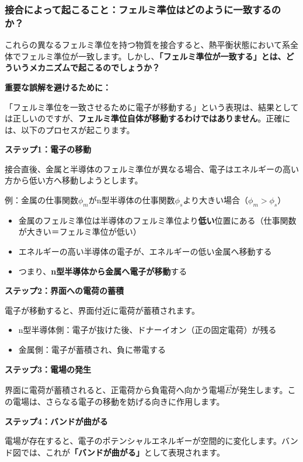 \subsubsection{接合によって起こること：フェルミ準位はどのように一致するのか？}

これらの異なるフェルミ準位を持つ物質を接合すると、熱平衡状態において系全体でフェルミ準位が一致します。しかし、\textbf{「フェルミ準位が一致する」とは、どういうメカニズムで起こるのでしょうか？}

\textbf{重要な誤解を避けるために：}

「フェルミ準位を一致させるために電子が移動する」という表現は、結果としては正しいのですが、\textbf{フェルミ準位自体が移動するわけではありません}。正確には、以下のプロセスが起こります。

\textbf{ステップ1：電子の移動}

接合直後、金属と半導体のフェルミ準位が異なる場合、電子はエネルギーの高い方から低い方へ移動しようとします。

例：金属の仕事関数$\phi_m$がn型半導体の仕事関数$\phi_s$より大きい場合（$\phi_m > \phi_s$）
\begin{itemize}
\item 金属のフェルミ準位は半導体のフェルミ準位より\textbf{低い}位置にある（仕事関数が大きい＝フェルミ準位が低い）
\item エネルギーの高い半導体の電子が、エネルギーの低い金属へ移動する
\item つまり、\textbf{n型半導体から金属へ電子が移動}する
\end{itemize}

\textbf{ステップ2：界面への電荷の蓄積}

電子が移動すると、界面付近に電荷が蓄積されます。
\begin{itemize}
\item n型半導体側：電子が抜けた後、ドナーイオン（正の固定電荷）が残る
\item 金属側：電子が蓄積され、負に帯電する
\end{itemize}

\textbf{ステップ3：電場の発生}

界面に電荷が蓄積されると、正電荷から負電荷へ向かう電場$\vec{E}$が発生します。この電場は、さらなる電子の移動を妨げる向きに作用します。

\textbf{ステップ4：バンドが曲がる}

電場が存在すると、電子のポテンシャルエネルギーが空間的に変化します。バンド図では、これが\textbf{「バンドが曲がる」}として表現されます。

